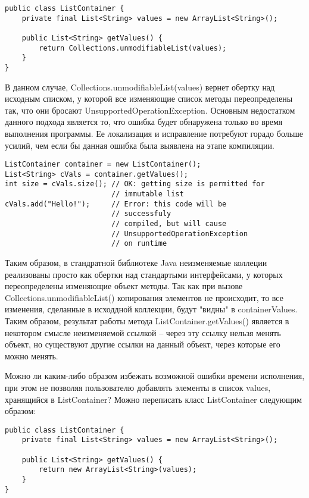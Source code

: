 \begin{lstlisting}[caption=Неизменяемый список, label=code:java_immutable_list]
public class ListContainer {
    private final List<String> values = new ArrayList<String>();   
    
    public List<String> getValues() {
        return Collections.unmodifiableList(values);
    }    
}
\end{lstlisting}

В данном случае, Collections.unmodifiableList(values) вернет обертку над исходным списком, у которой все изменяющие список методы переопределены так, что они бросают UnsupportedOperationException. Основным недостатком данного подхода является то, что ошибка будет обнаружена только во время выполнения программы. Ее локализация и исправление потребуют горадо больше усилий, чем если бы данная ошибка была выявлена на этапе компиляции.

\begin{lstlisting}[caption=Использование неизменяемого списка, label=code:java_immutable_list_usage]
ListContainer container = new ListContainer();
List<String> cVals = container.getValues();
int size = cVals.size(); // OK: getting size is permitted for 
                         // immutable list
cVals.add("Hello!");     // Error: this code will be 
                         // successfuly 
                         // compiled, but will cause 
                         // UnsupportedOperationException 
                         // on runtime	
\end{lstlisting}

Таким образом, в стандратной библиотеке Java неизменяемые коллеции реализованы просто как обертки над стандартыми интерфейсами, у которых переопределены изменяющие объект методы. Так как при вызове Collections.unmodifiableList() копирования элементов не происходит, то все изменения, сделанные в исходдной коллекции, будут "видны" в containerValues. Таким образом, результат работы метода ListContainer.getValues() является в некотором смысле неизменяемой ссылкой -- через эту ссылку нельзя менять объект, но существуют другие ссылки на данный объект, через которые его можно менять.

Можно ли каким-либо образом избежать возможной ошибки времени исполнения, при этом не позволяя пользователю добавлять элементы в список values, хранящийся в ListContainer? Можно переписать класс ListContainer следующим образом:

\begin{lstlisting}[caption=Неизменяемый список, label=code:java_immutable_list]
public class ListContainer {
    private final List<String> values = new ArrayList<String>();   
    
    public List<String> getValues() {
        return new ArrayList<String>(values);
    }    
}
\end{lstlisting}

